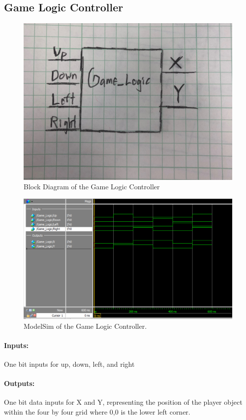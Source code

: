 \documentclass[]{article}
\begin{document}
\subsection{Game Logic Controller}
\begin{figure}[H]\centering
	\includegraphics[width=\linewidth]{figures/Game_Logic_Diagram}
	\caption{Block Diagram of the Game Logic Controller}
\end{figure}
\begin{figure}[H]\centering
	\includegraphics[width=\linewidth]{figures/Game_Logic_ModelSim.png}
	\caption{ModelSim of the Game Logic Controller.}
\end{figure}
\paragraph{Inputs:} One bit inputs for up, down, left, and right
\paragraph{Outputs:} One bit data inputs for X and Y, representing the position of the player object within the four by four grid where 0,0 is the lower left corner.
\end{document}
